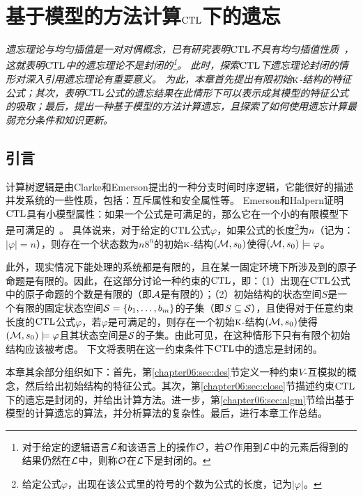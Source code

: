 \chapter{基于模型的方法计算$\textrm{CTL}$下的遗忘}\label{chapter05}

{\em
	遗忘理论与均匀插值是一对对偶概念，已有研究表明$\textrm{CTL}$不具有均匀插值性质~\cite{Maksimova:JANCL:1991}，这就表明$\textrm{CTL}$中的遗忘理论不是封闭的\footnote{对于给定的逻辑语言${\cal L}$和该语言上的操作${\cal O}$，若$\cal O$作用到$\cal L$中的元素后得到的结果仍然在$\cal L$中，则称$\cal O$在$\cal L$下是封闭的。}。
	此时，探索$\textrm{CTL}$下遗忘理论封闭的情形对深入引用遗忘理论有重要意义。
	为此，本章首先提出有限初始$\textsc{k}$-结构的特征公式；其次，表明$\textrm{CTL}$公式的遗忘结果在此情形下可以表示成其模型的特征公式的吸取；最后，提出一种基于模型的方法计算遗忘，且探索了如何使用遗忘计算最弱充分条件和知识更新。
}

\section{引言}\label{sec:chapter06_introduction}

计算树逻辑是由Clarke和Emerson提出的一种分支时间时序逻辑，它能很好的描述并发系统的一些性质，包括：互斥属性和安全属性等。
Emerson和Halpern证明$\textrm{CTL}$具有小模型属性：如果一个公式是可满足的，那么它在一个小的有限模型下是可满足的~\cite{DBLP:journals/jcss/EmersonH85}。
具体说来，对于给定的$\textrm{CTL}$公式$\varphi$，如果公式的长度\footnote{给定公式$\varphi$，出现在该公式里的符号的个数为公式的长度，记为$|\varphi|$。}为$n$（记为：$|\varphi| = n$），则存在一个状态数为$n8^n$的初始$\textsc{k}$-结构$({\cal M},s_0)$使得$({\cal M},s_0)\models \varphi$。

此外，现实情况下能处理的系统都是有限的，且在某一固定环境下所涉及到的原子命题是有限的。因此，在这部分讨论一种约束的$\textrm{CTL}$，即：（1）出现在$\textrm{CTL}$公式中的原子命题的个数是有限的（即${\cal A}$是有限的）；（2）初始结构的状态空间$S$是一个有限的固定状态空间${\cal S}=\{b_1,\ldots,b_m\}$的子集（即$S \subseteq {\cal S}$），且使得对于任意约束长度的$\textrm{CTL}$公式$\varphi$，若$\varphi$是可满足的，则存在一个初始$\textsc{k}$-结构$({\cal M},s_0)$使得$({\cal M},s_0)\models \varphi$且其状态空间是${\cal S}$的子集。由此可见，在这种情形下只有有限个初始结构应该被考虑。
下文将表明在这一约束条件下$\textrm{CTL}$中的遗忘是封闭的。

本章其余部分组织如下：首先，第\ref{chapter06:sec:des}节定义一种约束$V$-互模拟的概念，然后给出初始结构的特征公式。其次，第\ref{chapter06:sec:close}节描述约束$\textrm{CTL}$下的遗忘是封闭的，并给出计算方法。进一步，第\ref{chapter06:sec:algm}节给出基于模型的计算遗忘的算法，并分析算法的复杂性。最后，进行本章工作总结。

